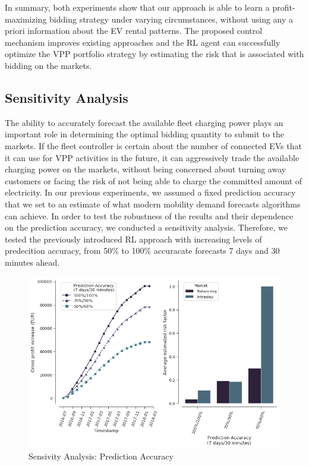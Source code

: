\documentclass[a4paper, 12pt]{article}
\begin{document}
In summary, both experiments show that our approach is able to learn a
profit-maximizing bidding strategy under varying circumstances, without using
any a priori information about the EV rental patterns. The proposed control
mechanism improves existing approaches and the RL agent can successfully
optimize the VPP portfolio strategy by estimating the risk that is associated
with bidding on the markets.

\subsection{Sensitivity Analysis}
\label{sec:org76fe08b}
The ability to accurately forecast the available fleet charging power plays an
important role in determining the optimal bidding quantity to submit to the
markets. If the fleet controller is certain about the number of connected EVs
that it can use for VPP activities in the future, it can aggressively trade the
available charging power on the markets, without being concerned about turning
away customers or facing the risk of not being able to charge the committed
amount of electricity. In our previous experiments, we assumed a fixed
prediction accuracy that we set to an estimate of what modern mobility demand
forecasts algorithms can achieve. In order to test the robustness of the results
and their dependence on the prediction accuracy, we conducted a sensitivity
analysis. Therefore, we tested the previously introduced RL approach with
increasing levels of predecition accuracy, from 50\% to 100\% accuracate forecasts
7 days and 30 minutes ahead.

\begin{figure}[htbp]
\centering
\includegraphics[width=1\linewidth]{fig/rl-accuracy.png}
\caption[Sensivity Analysis: Prediction Accuracy]{Sensivity Analysis: Prediction Accuracy \label{fig-sens-accuracy}}
\end{figure}
\end{document}
